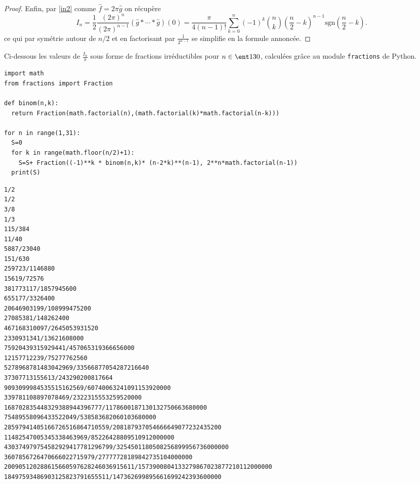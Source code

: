 \documentclass{notes}
\begin{document}
\begin{proof}
  Enfin, par \eqref{in2} comme $\hat f = 2\pi \hat g$ on récupère 
  \[ I_n = \frac 12 \frac{(2\pi)^{n}}{(2\pi)^{n-1}} \left( \hat g\ast \cdots \ast \hat  g \right)(0)  =  \frac{\pi}{4(n-1)!}  \sum_{k=0}^{n} (-1)^{k}\binom nk \left( \frac n2 - k \right)^{n-1}\mathrm{sgn}\left( \frac n2 - k \right) .  \]
  ce qui par symétrie autour de $n/2$ et en factorisant par $\frac 1{2^{n-1}}$ se simplifie en la formule annoncée.

\end{proof}

Ci-dessous les valeurs de $\frac{I_n}{\pi}$ sous forme de fractions irréductibles pour $n\in \ent 1{30}$, calculées grâce au module \verb+fractions+ de Python.

\begin{lstlisting}
import math
from fractions import Fraction

def binom(n,k):
  return Fraction(math.factorial(n),(math.factorial(k)*math.factorial(n-k)))

for n in range(1,31):
  S=0
  for k in range(math.floor(n/2)+1):
    S=S+ Fraction((-1)**k * binom(n,k)* (n-2*k)**(n-1), 2**n*math.factorial(n-1))
  print(S)
\end{lstlisting}
\begin{lstlisting}
1/2
1/2
3/8
1/3
115/384
11/40
5887/23040
151/630
259723/1146880
15619/72576
381773117/1857945600
655177/3326400
20646903199/108999475200
27085381/148262400
467168310097/2645053931520
2330931341/13621608000
75920439315929441/457065319366656000
12157712239/75277762560
5278968781483042969/33566877054287216640
37307713155613/243290200817664
9093099984535515162569/60740063241091153920000
339781108897078469/2322315553259520000
168702835448329388944396777/1178600187130132750663680000
75489558096433522049/538583682060103680000
28597941405166726516864710559/208187937054666649077232435200
11482547005345338463969/85226428809510912000000
430374979754582929417781296799/3254501180508256899956736000000
3607856726470666022715979/27777728189842735104000000
200905120288615660597628246036915611/1573900804133279867023877210112000000
18497593486903125823791655511/147362699895661699242393600000
\end{lstlisting}




 
\end{document}
